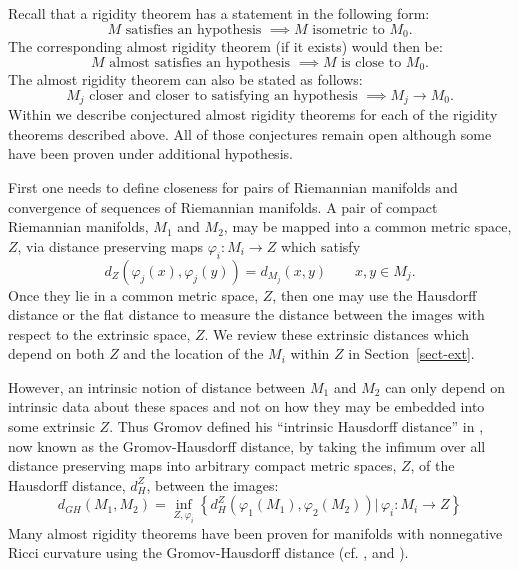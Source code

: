 \documentclass[12pt]{amsart}
\begin{document}
Recall that a rigidity theorem has a statement in the following form: 
\begin{equation}
M \textrm{ satisfies an hypothesis }  \implies M \textrm{ isometric to } M_0.
\end{equation}
The corresponding almost rigidity theorem (if it exists) would then be:
\begin{equation} \label{alm-rig-M}
M \textrm{ almost satisfies an hypothesis  }  \implies M \textrm{ is close to } M_0.
\end{equation}
The almost rigidity theorem can also be stated as follows:
\begin{equation}\label{alm-rig-Mj}
M_j \textrm{ closer and closer to satisfying an hypothesis }
\implies M_j \to M_0.
\end{equation}
Within we describe conjectured almost rigidity theorems for each of the 
rigidity theorems described above.  All of those conjectures remain
open although some have been proven under additional hypothesis.

First one needs to define
closeness for pairs of Riemannian manifolds and convergence of
sequences of Riemannian manifolds.
A pair of compact Riemannian manifolds, $M_1$ and $M_2$, may
be mapped into a common metric space, $Z$, via distance preserving
maps $\varphi_i: M_i\to Z$ which satisfy
\begin{equation}\label{isom-emb}
d_Z(\varphi_j(x), \varphi_j(y))= d_{M_j}(x,y) \qquad x,y \in M_j.
\end{equation}
Once they lie in a common metric space, $Z$, then one may use the
Hausdorff distance or the flat distance to measure the distance
between the images with respect to the extrinsic space, $Z$.  
We review these extrinsic distances which depend on both
$Z$ and the location of the $M_i$ within $Z$ in Section~\ref{sect-ext}.

However, an intrinsic notion of distance between $M_1$ and $M_2$ can
only depend on intrinsic data about these spaces and not on how they
may be embedded into some extrinsic $Z$.  Thus Gromov defined his
``intrinsic Hausdorff distance'' in \cite{Gromov-metric}, now known as the Gromov-Hausdorff distance,
by taking the infimum over
all distance preserving maps into arbitrary compact metric spaces, $Z$,
of the Hausdorff distance, $d_H^Z$, between the images:
\begin{equation}
d_{GH}(M_1, M_2) = \inf_{Z, \varphi_i}\left\{ d_H^Z(\varphi_1(M_1), \varphi_2(M_2))
|
\, \varphi_i: M_i\to Z
\right\} 
\end{equation}
Many almost rigidity theorems have been proven for manifolds with
nonnegative Ricci curvature using the Gromov-Hausdorff distance
(cf. \cite{Colding-volume}, \cite{ChCo-almost-rigidity} and \cite{Sor-cosmos}).
\end{document}
